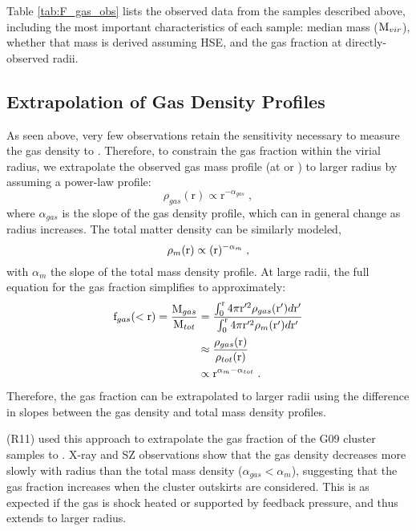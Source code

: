 Table \ref{tab:F_gas_obs} lists the observed data from the samples
described above, including the most important characteristics of each
sample: median mass ($\textrm{M\ensuremath{_{vir}}}$), whether that mass is derived
assuming HSE, and the gas fraction at directly-observed radii.



\subsection{Extrapolation of Gas Density Profiles}
\label{sec:Gas.Extrapolation}
As seen above, very few observations retain the sensitivity necessary
to measure the gas density to \rvir{}. Therefore, to constrain the gas
fraction within the virial radius, we extrapolate the observed gas
mass profile (at \rtwo{} or \rfive{}) to larger radius by assuming a
power-law profile:
\begin{equation}
\rho_{gas}(\textrm{r}) \propto \textrm{r}^{-\alpha_{gas}}\;, 
\end{equation}
where $\alpha{}_{gas}$ is the slope of the gas density profile, which can in
general change as radius increases. The total
matter density can be similarly modeled,
\begin{equation}
\rho_{m}(\textrm{r}) \propto (\textrm{r})^{-\alpha_{m}}\;,
\end{equation}
with $\alpha{}_m$ the slope of the total mass density profile. At
large radii, the full equation for the gas fraction simplifies to approximately:
\begin{align}
\textrm{f\ensuremath{_{gas}}}(<\textrm{r}) = \frac{\textrm{M}_{gas}}{\textrm{M}_{tot}} &=
\frac{\int_0^{\textrm{r}} 4\pi{}\textrm{r}'^2\rho_{gas}(\textrm{r}')d\textrm{r}'}{\int_0^{\textrm{r}}
  4\pi{}\textrm{r}'^2\rho_{m}(\textrm{r}')d\textrm{r}'} \\ & \approx
\frac{\rho_{gas}(\textrm{r})}{\rho_{tot}(\textrm{r})} \nonumber\\ &\propto \textrm{r}^{\alpha_{m} - \alpha_{tot}}\;.
\end{align}
Therefore, the gas fraction can be extrapolated to larger radii using
the difference in slopes between the gas density and total mass
density profiles.

\textbf{\citet{Rasheed2011}} (R11) used this approach to extrapolate
the gas fraction of the G09 cluster samples to \rvir{}. X-ray and SZ
observations show that the gas density decreases more slowly with
radius than the total mass density ($\alpha_{gas} < \alpha_{m}$),
suggesting that the gas fraction increases when the cluster outskirts
are considered. This is as expected if the gas is shock heated or
supported by feedback pressure, and thus extends to larger radius.


